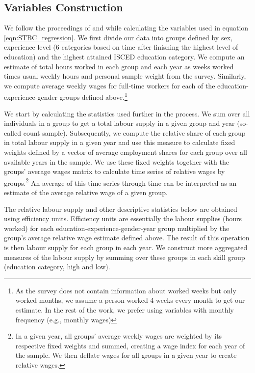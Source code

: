 \documentclass[11pt]{article}
\begin{document}
\subsection{Variables Construction} \label{KM_vars}
We follow the proceedings of \citet{katz1992changes} and \citet{glitz2021skill} while calculating the variables used in equation \ref{eqn:STBC_regression}. We first divide our data into groups defined by sex, experience level (6 categories based on time after finishing the highest level of education) and the highest attained ISCED education category.
We compute an estimate of total hours worked in each group and each year as weeks worked times usual weekly hours and personal sample weight from the survey. Similarly, we compute average weekly wages for full-time workers for each of the education-experience-gender groups defined above.\footnote{As the survey does not contain information about worked weeks but only worked months, we assume a person worked 4 weeks every month to get our estimate. In the rest of the work, we prefer using variables with monthly frequency (e.g., monthly wages)}

We start by calculating the statistics used further in the process. We sum over all individuals in a group to get a total labour supply in a given group and year (so-called count sample). Subsequently, we compute the relative share of each group in total labour supply in a given year and use this measure to calculate fixed weights defined by a vector of average employment shares for each group over all available years in the sample. We use these fixed weights together with the groups' average wages matrix to calculate time series of relative wages by groups.\footnote{In a given year, all groups' average weekly wages are weighted by its respective fixed weights and summed, creating a wage index for each year of the sample. %
We then deflate wages for all groups in a given year to create relative wages.} An average of this time series through time can be interpreted as an estimate of the average relative wage of a given group.

The relative labour supply and other descriptive statistics below are obtained using efficiency units. Efficiency units are essentially the labour supplies (hours worked) for each education-experience-gender-year group multiplied by the group's average relative wage estimate defined above. The result of this operation is then labour supply for each group in each year. We construct more aggregated measures of the labour supply by summing over these groups in each skill group (education category, high and low).
\end{document}
